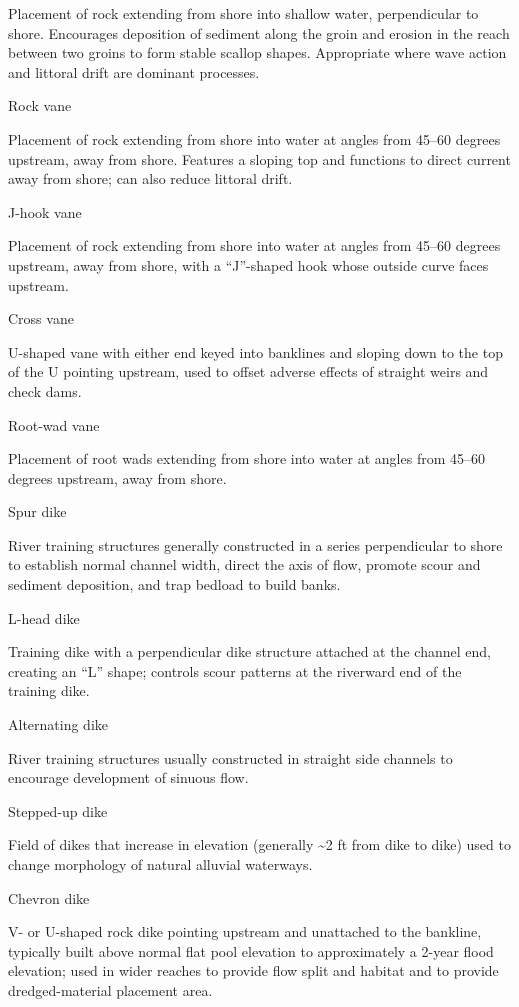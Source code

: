 \documentclass[
  letterpaper,
  DIV=11,
  numbers=noendperiod]{scrreprt}
\begin{document}
Placement of rock extending from shore into shallow water, perpendicular
to shore. Encourages deposition of sediment along the groin and erosion
in the reach between two groins to form stable scallop shapes.
Appropriate where wave action and littoral drift are dominant processes.

Rock vane

Placement of rock extending from shore into water at angles from 45--60
degrees upstream, away from shore. Features a sloping top and functions
to direct current away from shore; can also reduce littoral drift.

J-hook vane

Placement of rock extending from shore into water at angles from 45--60
degrees upstream, away from shore, with a ``J''-shaped hook whose
outside curve faces upstream.

Cross vane

U-shaped vane with either end keyed into banklines and sloping down to
the top of the U pointing upstream, used to offset adverse effects of
straight weirs and check dams.

Root-wad vane

Placement of root wads extending from shore into water at angles from
45--60 degrees upstream, away from shore.

Spur dike

River training structures generally constructed in a series
perpendicular to shore to establish normal channel width, direct the
axis of flow, promote scour and sediment deposition, and trap bedload to
build banks.

L-head dike

Training dike with a perpendicular dike structure attached at the
channel end, creating an ``L'' shape; controls scour patterns at the
riverward end of the training dike.

Alternating dike

River training structures usually constructed in straight side channels
to encourage development of sinuous flow.

Stepped-up dike

Field of dikes that increase in elevation (generally \textasciitilde2 ft
from dike to dike) used to change morphology of natural alluvial
waterways.

Chevron dike

V- or U-shaped rock dike pointing upstream and unattached to the
bankline, typically built above normal flat pool elevation to
approximately a 2-year flood elevation; used in wider reaches to provide
flow split and habitat and to provide dredged-material placement area.
\end{document}
